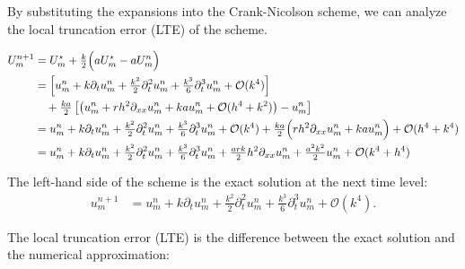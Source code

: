 By substituting the expansions into the Crank-Nicolson scheme, we can analyze the local truncation error (LTE) of the scheme.

\begin{align*}
  U_m^{n+1} & = U_m^\star + \tfrac{k}{2} \Bigl( aU_m^\star - aU_m^n \Bigr)                                                                                                                                               \\
            & = \left[ u_m^n + k\partial_t u_m^n + \tfrac{k^2}{2}\partial_t^2 u_m^n + \tfrac{k^3}{6}\partial_t^3 u_m^n + \mathcal{O}(k^4) \right]                                                                        \\
            & \quad {}+ \tfrac{ka}{2}\left[\left( u_m^n + rh^2\partial_{xx} u_m^n + kau_m^n + \mathcal{O}(h^4+k^2) \right) - u_m^n \right]                                                                               \\
            & = u_m^n + k\partial_t u_m^n + \tfrac{k^2}{2}\partial_t^2 u_m^n + \tfrac{k^3}{6}\partial_t^3 u_m^n + \mathcal{O}(k^4) + \tfrac{ka}{2}\Bigl( rh^2\partial_{xx} u_m^n + kau_m^n \Bigr) + \mathcal{O}(h^4+k^4) \\
            & = u_m^n + k\partial_t u_m^n + \tfrac{k^2}{2}\partial_t^2 u_m^n
  + \tfrac{k^3}{6}\partial_t^3 u_m^n
  + \tfrac{ark}{2}h^2\partial_{xx} u_m^n + \tfrac{a^2k^2}{2}u_m^n
  + \mathcal{O}(k^4+h^4)
\end{align*}

The left-hand side of the scheme is the exact solution at the next time level:
\begin{align*}
  u_m^{n+1} & = u_m^n + k\partial_t u_m^n + \tfrac{k^2}{2}\partial_t^2 u_m^n + \tfrac{k^3}{6}\partial_t^3 u_m^n + \mathcal{O}(k^4).
\end{align*}

The local truncation error (LTE) is the difference between the exact solution and the numerical approximation:

